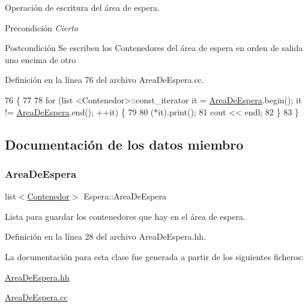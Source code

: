 Operación de escritura del área de espera. 

\begin{DoxyPrecond}{Precondición}
{\itshape Cierto} 
\end{DoxyPrecond}
\begin{DoxyPostcond}{Postcondición}
Se escriben los Contenedores del área de espera en orden de salida uno encima de otro 
\end{DoxyPostcond}


Definición en la línea 76 del archivo Area\+De\+Espera.\+cc.


\begin{DoxyCode}
76                                          \{
77     
78     \textcolor{keywordflow}{for} (list <Contenedor>::const\_iterator it = \hyperlink{class_espera_adafca5e22c5bc21e517b363144fc6b18}{AreaDeEspera}.begin(); it != 
      \hyperlink{class_espera_adafca5e22c5bc21e517b363144fc6b18}{AreaDeEspera}.end(); ++it) \{
79         
80         (*it).print();
81         cout << endl;
82     \}
83 \}
\end{DoxyCode}


\subsection{Documentación de los datos miembro}
\mbox{\label{class_espera_adafca5e22c5bc21e517b363144fc6b18}} 
\subsubsection{\texorpdfstring{Area\+De\+Espera}{AreaDeEspera}}
{\footnotesize\ttfamily list$<$\hyperlink{class_contenedor}{Contenedor}$>$ Espera\+::\+Area\+De\+Espera\hspace{0.3cm}{\ttfamily [private]}}



Lista para guardar los contenedores que hay en el área de espera. 



Definición en la línea 28 del archivo Area\+De\+Espera.\+hh.



La documentación para esta clase fue generada a partir de los siguientes ficheros\+:\begin{DoxyCompactItemize}
\item 
\hyperlink{_area_de_espera_8hh}{Area\+De\+Espera.\+hh}\item 
\hyperlink{_area_de_espera_8cc}{Area\+De\+Espera.\+cc}\end{DoxyCompactItemize}
